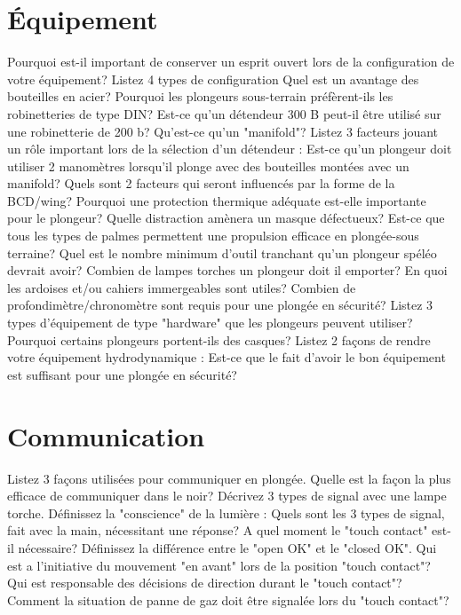 \documentclass[english,10pt,a4paper]{article}
\begin{document}
	\section{Équipement}

	\begin{outline}
		\1 Pourquoi est-il important de conserver un esprit ouvert lors de la configuration de votre équipement?
		\1 Listez 4 types de configuration
		\1 Quel est un avantage des bouteilles en acier?
		\1 Pourquoi les plongeurs sous-terrain préfèrent-ils les robinetteries de type DIN?
		\1 Est-ce qu’un détendeur 300 B peut-il être utilisé sur une robinetterie de 200 b?
		\1 Qu’est-ce qu’un "manifold"?
		\1 Listez 3 facteurs jouant un rôle important lors de la sélection d’un détendeur :
		\1 Est-ce qu’un plongeur doit utiliser 2 manomètres lorsqu’il plonge avec des bouteilles montées avec un manifold?
		\1 Quels sont 2 facteurs qui seront influencés par la forme de la BCD/wing?
		\1 Pourquoi une protection thermique adéquate est-elle importante pour le plongeur?
		\1 Quelle distraction amènera un masque défectueux?
		\1 Est-ce que tous les types de palmes permettent une propulsion efficace en plongée-sous terraine?
		\1 Quel est le nombre minimum d’outil tranchant qu’un plongeur spéléo devrait avoir?
		\1 Combien de lampes torches un plongeur doit il emporter?
		\1 En quoi les ardoises et/ou cahiers immergeables sont utiles?
		\1 Combien de profondimètre/chronomètre sont requis pour une plongée en sécurité?
		\1 Listez 3 types d’équipement de type "hardware" que les plongeurs peuvent utiliser?
		\1 Pourquoi certains plongeurs portent-ils des casques?
		\1 Listez 2 façons de rendre votre équipement hydrodynamique :
		\1 Est-ce que le fait d’avoir le bon équipement est suffisant pour une plongée en sécurité?
	\end{outline}
	\sectionpage

	\section{Communication}

	\begin{outline}
		\1 Listez 3 façons utilisées pour communiquer en plongée.
		\1 Quelle est la façon la plus efficace de communiquer dans le noir?
		\1 Décrivez 3 types de signal avec une lampe torche.
		\1 Définissez la "conscience" de la lumière :
		\1 Quels sont les 3 types de signal, fait avec la main, nécessitant une réponse?
		\1 A quel moment le "touch contact" est-il nécessaire?
		\1 Définissez la différence entre le "open OK" et le "closed OK".
		\1 Qui est a l’initiative du mouvement "en avant" lors de la position "touch contact"?
		\1 Qui est responsable des décisions de direction durant le "touch contact"?
		\1 Comment la situation de panne de gaz doit être signalée lors du "touch contact"?
	\end{outline}
	\sectionpage
\end{document}
